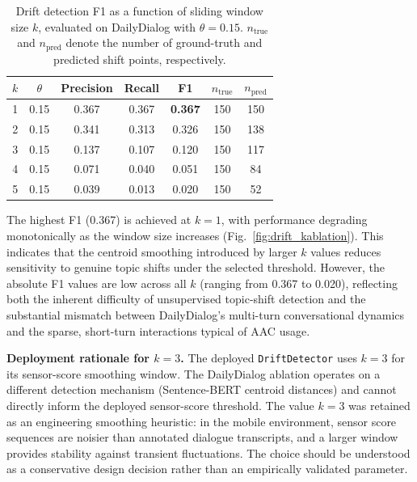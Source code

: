 \documentclass[journal]{IEEEtran}
\begin{document}
\begin{table}[htbp]
\centering
\caption{Drift detection F1 as a function of sliding window size $k$, evaluated on DailyDialog with $\theta = 0.15$. $n_{\text{true}}$ and $n_{\text{pred}}$ denote the number of ground-truth and predicted shift points, respectively.}
\label{tab:drift}
\begin{tabular}{ccccccc}
\hline
$k$ & $\theta$ & Precision & Recall & F1 & $n_{\text{true}}$ & $n_{\text{pred}}$ \\
\hline
1 & 0.15 & 0.367 & 0.367 & \textbf{0.367} & 150 & 150 \\
2 & 0.15 & 0.341 & 0.313 & 0.326 & 150 & 138 \\
3 & 0.15 & 0.137 & 0.107 & 0.120 & 150 & 117 \\
4 & 0.15 & 0.071 & 0.040 & 0.051 & 150 & 84 \\
5 & 0.15 & 0.039 & 0.013 & 0.020 & 150 & 52 \\
\hline
\end{tabular}
\end{table}

The highest F1 (0.367) is achieved at $k = 1$, with performance degrading monotonically as the window size increases (Fig.~\ref{fig:drift_kablation}). This indicates that the centroid smoothing introduced by larger $k$ values reduces sensitivity to genuine topic shifts under the selected threshold. However, the absolute F1 values are low across all $k$ (ranging from 0.367 to 0.020), reflecting both the inherent difficulty of unsupervised topic-shift detection and the substantial mismatch between DailyDialog's multi-turn conversational dynamics and the sparse, short-turn interactions typical of AAC usage.

\textbf{Deployment rationale for $k = 3$.} The deployed \texttt{DriftDetector} uses $k = 3$ for its sensor-score smoothing window. The DailyDialog ablation operates on a different detection mechanism (Sentence-BERT centroid distances) and cannot directly inform the deployed sensor-score threshold. The value $k = 3$ was retained as an engineering smoothing heuristic: in the mobile environment, sensor score sequences are noisier than annotated dialogue transcripts, and a larger window provides stability against transient fluctuations. The choice should be understood as a conservative design decision rather than an empirically validated parameter.
\end{document}
